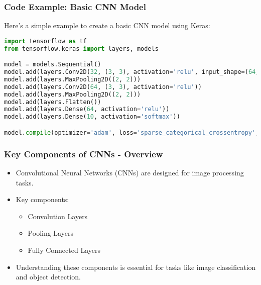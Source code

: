 \documentclass[aspectratio=169]{beamer}
\begin{document}
\begin{frame}[fragile]
    \frametitle{Code Example: Basic CNN Model}
    Here’s a simple example to create a basic CNN model using Keras:
    \begin{lstlisting}[language=Python]
import tensorflow as tf
from tensorflow.keras import layers, models

model = models.Sequential()
model.add(layers.Conv2D(32, (3, 3), activation='relu', input_shape=(64, 64, 3)))
model.add(layers.MaxPooling2D((2, 2)))
model.add(layers.Conv2D(64, (3, 3), activation='relu'))
model.add(layers.MaxPooling2D((2, 2)))
model.add(layers.Flatten())
model.add(layers.Dense(64, activation='relu'))
model.add(layers.Dense(10, activation='softmax'))

model.compile(optimizer='adam', loss='sparse_categorical_crossentropy', metrics=['accuracy'])
    \end{lstlisting}
\end{frame}

\begin{frame}[fragile]
    \frametitle{Key Components of CNNs - Overview}
    \begin{itemize}
        \item Convolutional Neural Networks (CNNs) are designed for image processing tasks.
        \item Key components:
        \begin{itemize}
            \item Convolution Layers
            \item Pooling Layers
            \item Fully Connected Layers
        \end{itemize}
        \item Understanding these components is essential for tasks like image classification and object detection.
    \end{itemize}
\end{frame}
\end{document}
